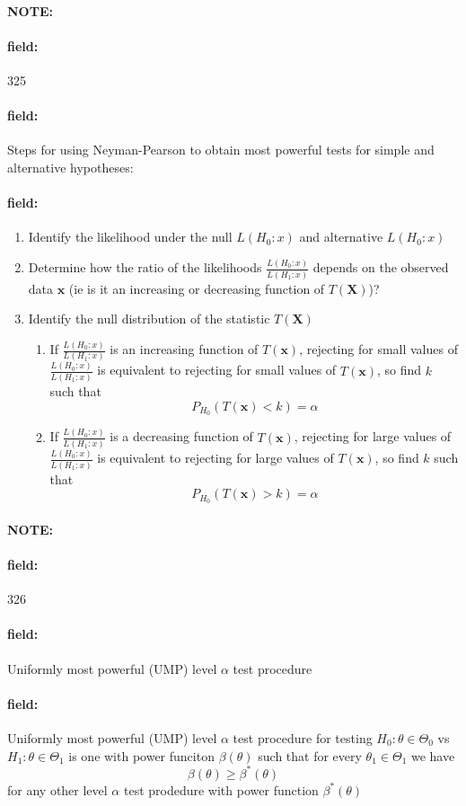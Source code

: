 \documentclass[12pt]{article}
\newenvironment{note}{\paragraph{NOTE:}}{}
\newenvironment{field}{\paragraph{field:}}{}
\begin{document}
\begin{note}
    \begin{field}
        \tiny 325
    \end{field}
    \begin{field}
        Steps for using Neyman-Pearson to obtain most powerful tests for simple and alternative hypotheses:
    \end{field}
    \begin{field}
        \begin{enumerate}
          \item Identify the likelihood under the null $L(H_0:x)$ and alternative $L(H_0: x)$
          \item Determine how the ratio of the likelihoods $ \frac{L(H_0:x)}{L(H_1:x)}$ depends on the observed data $\mathbf{x}$ (ie is it an increasing or decreasing function of $T(\mathbf{X})$)?
          \item Identify the null distribution of the statistic $T(\mathbf{X})$
          \begin{enumerate}
            \item If $\frac{L(H_0:x)}{L(H_1:x)}$ is an increasing function of $T(\mathbf{x})$, rejecting for small values of $\frac{L(H_0:x)}{L(H_1:x)}$ is equivalent to rejecting for small values of $T(\mathbf{x})$, so find $k$ such that
            $$P_{H_0}(T(\mathbf{x}) < k) = \alpha $$
            \item If $\frac{L(H_0:x)}{L(H_1:x)}$ is a decreasing  function of $T(\mathbf{x})$, rejecting for large values of $\frac{L(H_0:x)}{L(H_1:x)}$ is equivalent to rejecting for large values of $T(\mathbf{x})$, so find $k$ such that
            $$P_{H_0}(T(\mathbf{x}) > k) = \alpha $$
          \end{enumerate}
        \end{enumerate}
    \end{field}
\end{note}


\begin{note}
    \begin{field}
        \tiny 326
    \end{field}
    \begin{field}
        Uniformly most powerful (UMP) level $\alpha$ test procedure
    \end{field}
    \begin{field}
        Uniformly most powerful (UMP) level $\alpha$ test procedure for testing $H_0: \theta \in \Theta_0$ vs $H_1: \theta \in \Theta_1$ is one with power funciton $\beta(\theta)$ such that for every $\theta_1 \in \Theta_1$ we have
        $$ \beta(\theta) \geq \beta^*(\theta)$$
        for any other level $\alpha$ test prodedure with power function $\beta^*(\theta)$
    \end{field}
\end{note}
\end{document}
